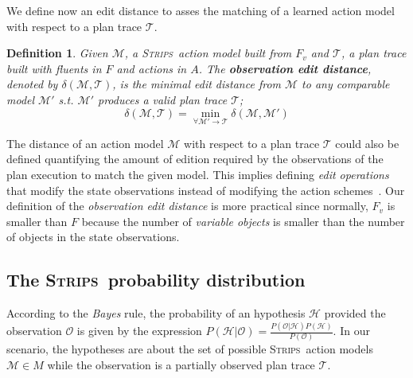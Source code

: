 \documentclass[letterpaper]{article} %
\newcommand{\strips}{\textsc{Strips}}     %
\newtheorem{definition}[theorem]{Definition}
\begin{document}
We define now an edit distance to asses the matching of a learned action model with respect to a plan trace $\mathcal{T}$. 

\begin{definition}
  Given $\mathcal{M}$, a \strips\ action model built from $F_v$ and $\mathcal{T}$, a plan trace built with fluents in $F$ and actions in $A$. The {\bf observation edit distance}, denoted by  $\delta(\mathcal{M},\mathcal{T})$, is the minimal edit distance from $\mathcal{M}$ to any {\em comparable} model $\mathcal{M}'$ s.t. $\mathcal{M}'$ produces a valid plan trace $\mathcal{T}$; \[\delta(\mathcal{M},\mathcal{T})=\min_{\forall \mathcal{M}' \rightarrow \mathcal{T}} \delta(\mathcal{M},\mathcal{M}')\]
\end{definition}

The distance of an action model $\mathcal{M}$ with respect to a plan trace $\mathcal{T}$ could also be defined quantifying the amount of edition required by the observations of the plan execution to match the given model. This implies defining {\em edit operations} that modify the state observations instead of modifying the action schemes~\cite{sohrabi:precognition:IJCAI2016}. Our definition of the {\em observation edit distance} is more practical since normally, $F_v$ is smaller than $F$ because the number of {\em variable objects} is smaller than the number of objects in the state observations.


\subsection{The \strips\ probability distribution}
According to the {\em Bayes} rule, the probability of an hypothesis $\mathcal{H}$ provided the observation $\mathcal{O}$ is given by the expression $P(\mathcal{H}|\mathcal{O})=\frac{P(\mathcal{O}|\mathcal{H})P(\mathcal{H})}{P(\mathcal{O})}$. In our scenario, the hypotheses are about the set of possible \strips\ action models $\mathcal{M}\in M$ while the observation is a partially observed plan trace $\mathcal{T}$.
\end{document}
